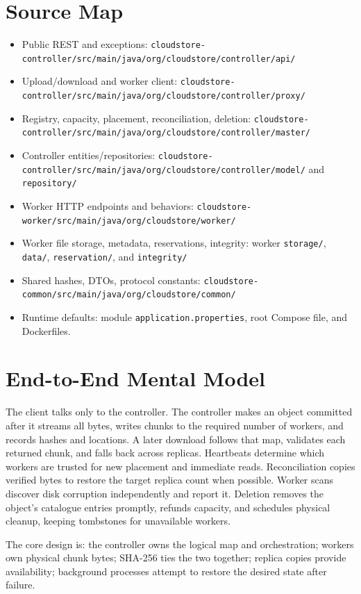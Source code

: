 \documentclass[11pt,a4paper]{article}
\begin{document}
\section{Source Map}
\begin{itemize}
\item Public REST and exceptions: \nolinkurl{cloudstore-controller/src/main/java/org/cloudstore/controller/api/}
\item Upload/download and worker client: \nolinkurl{cloudstore-controller/src/main/java/org/cloudstore/controller/proxy/}
\item Registry, capacity, placement, reconciliation, deletion: \nolinkurl{cloudstore-controller/src/main/java/org/cloudstore/controller/master/}
\item Controller entities/repositories: \nolinkurl{cloudstore-controller/src/main/java/org/cloudstore/controller/model/} and \texttt{repository/}
\item Worker HTTP endpoints and behaviors: \nolinkurl{cloudstore-worker/src/main/java/org/cloudstore/worker/}
\item Worker file storage, metadata, reservations, integrity: worker \texttt{storage/}, \texttt{data/}, \texttt{reservation/}, and \texttt{integrity/}
\item Shared hashes, DTOs, protocol constants: \texttt{cloudstore-common/src/main/java/org/cloudstore/common/}
\item Runtime defaults: module \texttt{application.properties}, root Compose file, and Dockerfiles.
\end{itemize}

\section{End-to-End Mental Model}
The client talks only to the controller. The controller makes an object committed after it streams all bytes, writes chunks to the required number of workers, and records hashes and locations. A later download follows that map, validates each returned chunk, and falls back across replicas. Heartbeats determine which workers are trusted for new placement and immediate reads. Reconciliation copies verified bytes to restore the target replica count when possible. Worker scans discover disk corruption independently and report it. Deletion removes the object's catalogue entries promptly, refunds capacity, and schedules physical cleanup, keeping tombstones for unavailable workers.

The core design is: the controller owns the logical map and orchestration; workers own physical chunk bytes; SHA-256 ties the two together; replica copies provide availability; background processes attempt to restore the desired state after failure.
\end{document}
